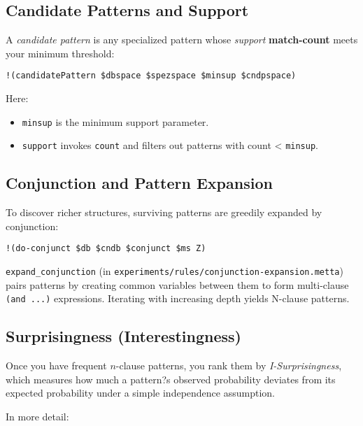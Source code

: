 \documentclass{article}
\begin{document}
\subsection{Candidate Patterns and Support}

A \emph{candidate pattern} is any specialized pattern whose \emph{support}  \textbf{match-count} meets your minimum threshold:

\begin{verbatim}
!(candidatePattern $dbspace $spezspace $minsup $cndpspace)
\end{verbatim}

Here:\\

\begin{itemize}
  \item \texttt{minsup} is the minimum support parameter.
  \item \texttt{support} invokes \texttt{count} and filters out patterns with count < \texttt{minsup}.
\end{itemize}

\subsection{Conjunction and Pattern Expansion}

To discover richer structures, surviving patterns are greedily expanded by conjunction:

\begin{verbatim}
!(do-conjunct $db $cndb $conjunct $ms Z)
\end{verbatim}

\texttt{expand_conjunction} (in \texttt{experiments/rules/conjunction-expansion.metta}) pairs patterns by creating common variables between them to form multi-clause \verb|(and ...)| expressions.  Iterating with increasing depth yields N-clause patterns.

\subsection{Surprisingness (Interestingness)}

Once you have frequent $n$-clause patterns, you rank them by \emph{I-Surprisingness}, which measures how much a pattern?s observed probability deviates from its expected probability under a simple independence assumption.  

In more detail:
\end{document}
